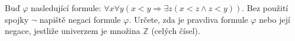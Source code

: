 \subsubsection{}
Buď $\varphi$ nasledující formule: $\forall x \forall y (x < y \Rightarrow
\exists z (x<z\wedge z<y))$. Bez použití
spojky $\neg$ napiště negaci formule $\varphi$. Určete, zda je pravdiva formule
$\varphi$ nebo její
negace, jestliže univerzem je množina $\mathbb{Z}$ (celých čísel).
